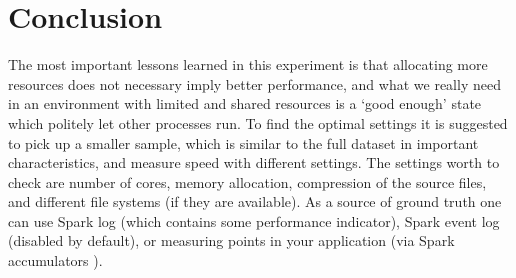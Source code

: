 \section{Conclusion}

The most important lessons learned in this experiment is that allocating more resources does not necessary imply better performance, and what we really need in an environment with limited and shared resources is a `good enough' state which politely let other processes run. To find the optimal settings it is suggested to pick up a smaller sample, which is similar to the full dataset in important characteristics, and measure speed with different settings. The settings worth to check are number of cores, memory allocation, compression of the source files, and different file systems (if they are available). As a source of ground truth one can use Spark log (which contains some performance indicator), Spark event log (disabled by default), or measuring points in your application (via Spark accumulators \cite{spark-accumulators}).

% 
% 
